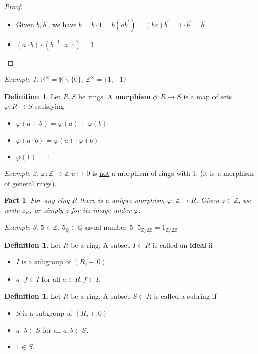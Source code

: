 \documentclass{amsart}
\newcommand{\RR}{\mathbb{R}}
\newcommand{\QQ}{\mathbb{Q}}
\newcommand{\ZZ}{\mathbb{Z}}
\newcommand{\Zn}[1]{\mathbb{Z} / #1 \mathbb{Z}}
\newtheorem{fact}[thm]{Fact}
\theoremstyle{definition}
\newtheorem{defn}[thm]{Definition}
\theoremstyle{remark}
\newtheorem*{ex}{Example}
\begin{document}
\begin{proof} \hspace{0.5cm}
    \begin{itemize}
        \item Given $b, b^\prime$, we have $b = b \cdot 1 = b(ab^\prime) = (ba)b^\prime = 1 \cdot b^\prime
         = b^\prime$.
         \item $(a \cdot b) \cdot (b^{-1} \cdot a^{-1}) = 1$
    \end{itemize}
\end{proof}
\begin{ex}
    $\RR^\times = \RR \backslash \{0\}$, $\ZZ^\times = \{1, -1\}$
\end{ex}
\begin{defn}
    Let $R, S$ be rings. A \textbf{morphism} $\phi:R \rightarrow S$ is a map of
    sets $\varphi:R \rightarrow S$ satisfying
    \begin{itemize}
        \item $\varphi(a + b) = \varphi(a) + \varphi(b)$
        \item $\varphi(a \cdot b) = \varphi(a) \cdot \varphi(b)$
        \item $\varphi(1) = 1$
    \end{itemize}
\end{defn}
\begin{ex}
    $\varphi:\ZZ \rightarrow \ZZ$ $u \mapsto 0$ is \underline{not} a morphism of
    rings with 1. (it is a morphism of general rings).
\end{ex}
\begin{fact}\label{fact:!morph}
    For any ring $R$ there is a unique morphism $\varphi:\ZZ \rightarrow R$. Given
    $z \in \ZZ$, we write $z_{R}$, or simply $z$ for its image under $\varphi$.
\end{fact}
\begin{ex}
    $5 \in \ZZ$, $5_{\QQ} \in \QQ$ usual number $5$. $5_{\Zn 2} = 1_{\Zn 2}$
\end{ex}
\begin{defn}
    Let $R$ be a ring. A subset $I \subset R$ is called an \textbf{ideal} if
    \begin{itemize}
        \item $I$ is a subgroup of $(R, +, 0)$
        \item $a \cdot f \in I$ for all $a \in R, f \in I$.
    \end{itemize}
\end{defn}
\begin{defn}
    Let $R$ be a ring. A subset $S \subset R$ is called a subring if
    \begin{itemize}
        \item $S$ is a subgroup of $(R, +, 0)$
        \item $a \cdot b \in S$ for all $a, b \in S$.
        \item $1 \in S$.
    \end{itemize}
\end{defn}
\end{document}
